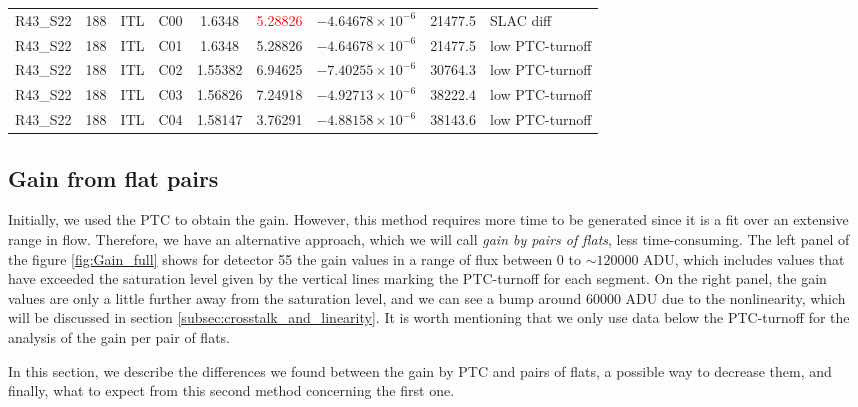 \begin{landscape}
\begin{table}[!htb]
\begin{tabular}{ccccccccp{}}
    R43\_S22       &            188 & ITL      & C00  &      1.6348               & \textcolor{red}{5.28826} &  $-4.64678 \times 10^{-6}$                 & 21477.5   & SLAC diff\\
    R43\_S22       &            188 & ITL      & C01  &      1.6348               &      5.28826             &  $-4.64678 \times 10^{-6}$                 & 21477.5   & low PTC-turnoff\\
    R43\_S22       &            188 & ITL      & C02  &      1.55382              &      6.94625             &  $-7.40255 \times 10^{-6}$                 & 30764.3   & low PTC-turnoff\\
    R43\_S22       &            188 & ITL      & C03  &      1.56826              &      7.24918             &  $-4.92713 \times 10^{-6}$                 & 38222.4   & low PTC-turnoff\\
    R43\_S22       &            188 & ITL      & C04  &      1.58147              &      3.76291             &  $-4.88158 \times 10^{-6}$                 & 38143.6   & low PTC-turnoff\\
    \hline
    \end{tabular}
\end{table}
\end{landscape}

\subsection{Gain from flat pairs}

Initially, we used the PTC to obtain the gain. However, this method requires more time to be generated since it is a fit over an extensive range in flow. Therefore, we have an alternative approach, which we will call \textit{gain by pairs of flats}, less time-consuming. The left panel of the figure \ref{fig:Gain_full} shows for detector 55 the gain values in a range of flux between $0$ to $\sim 120000$ ADU, which includes values that have exceeded the saturation level given by the vertical lines marking the PTC-turnoff for each segment. On the right panel, the gain values are only a little further away from the saturation level, and we can see a bump around 60000 ADU due to the nonlinearity, which will be discussed in section \ref{subsec:crosstalk_and_linearity}. It is worth mentioning that we only use data below the PTC-turnoff for the analysis of the gain per pair of flats. 
 
\vspace{3mm}
In this section, we describe the differences we found between the gain by PTC and pairs of flats, a possible way to decrease them, and finally, what to expect from this second method concerning the first one.

